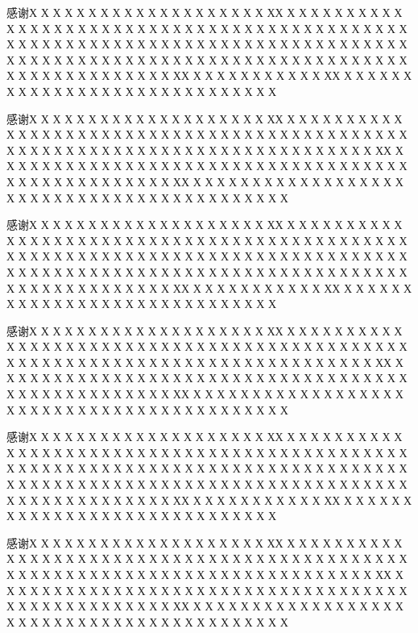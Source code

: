 \begin{thank}
	感谢Х Х Х Х Х Х Х Х Х Х Х  Х Х Х Х Х Х Х Х Х ХХ Х Х Х Х Х  Х Х Х Х Х Х Х Х Х Х Х Х Х Х Х Х Х Х Х Х Х Х Х Х Х Х Х Х Х Х Х Х Х Х Х Х Х Х Х Х Х Х Х Х Х Х Х Х  Х Х Х Х Х Х Х Х Х Х Х Х Х Х Х Х  Х Х Х Х Х Х Х Х Х Х Х Х Х Х Х Х Х Х Х Х Х Х Х Х Х Х Х Х Х Х Х Х Х Х Х Х Х Х Х Х Х Х Х Х Х Х Х Х  Х Х Х Х Х Х Х Х Х ХХ Х Х Х Х Х  Х Х Х Х Х Х ХХ Х Х Х Х Х Х Х Х Х Х Х Х Х Х Х Х Х Х Х Х Х Х Х Х Х Х Х Х Х  \par
	感谢Х Х Х Х Х Х Х Х Х Х Х  Х Х Х Х Х Х Х Х Х ХХ Х Х Х Х Х  Х Х Х Х Х Х Х Х Х Х Х Х Х Х Х Х Х Х Х Х Х Х Х Х Х Х Х Х Х Х Х Х Х Х Х Х Х Х Х Х Х Х Х Х Х Х Х Х  Х Х Х Х Х Х Х Х Х Х Х Х Х Х Х Х  Х Х Х Х Х Х ХХ Х Х Х Х Х Х Х Х Х Х Х Х Х Х Х Х Х Х Х Х Х Х Х Х Х Х Х Х Х Х Х Х Х Х Х Х Х Х Х Х  Х Х Х Х Х Х Х Х Х ХХ Х Х Х Х Х Х Х Х Х Х Х Х Х Х Х Х Х Х Х Х Х Х Х Х Х Х Х Х Х Х Х Х Х Х Х Х Х Х Х Х Х Х  \par
	感谢Х Х Х Х Х Х Х Х Х Х Х  Х Х Х Х Х Х Х Х Х ХХ Х Х Х Х Х  Х Х Х Х Х Х Х Х Х Х Х Х Х Х Х Х Х Х Х Х Х Х Х Х Х Х Х Х Х Х Х Х Х Х Х Х Х Х Х Х Х Х Х Х Х Х Х Х  Х Х Х Х Х Х Х Х Х Х Х Х Х Х Х Х  Х Х Х Х Х Х Х Х Х Х Х Х Х Х Х Х Х Х Х Х Х Х Х Х Х Х Х Х Х Х Х Х Х Х Х Х Х Х Х Х Х Х Х Х Х Х Х Х  Х Х Х Х Х Х Х Х Х ХХ Х Х Х Х Х  Х Х Х Х Х Х ХХ Х Х Х Х Х Х Х Х Х Х Х Х Х Х Х Х Х Х Х Х Х Х Х Х Х Х Х Х Х  \par
	感谢Х Х Х Х Х Х Х Х Х Х Х  Х Х Х Х Х Х Х Х Х ХХ Х Х Х Х Х  Х Х Х Х Х Х Х Х Х Х Х Х Х Х Х Х Х Х Х Х Х Х Х Х Х Х Х Х Х Х Х Х Х Х Х Х Х Х Х Х Х Х Х Х Х Х Х Х  Х Х Х Х Х Х Х Х Х Х Х Х Х Х Х Х  Х Х Х Х Х Х ХХ Х Х Х Х Х Х Х Х Х Х Х Х Х Х Х Х Х Х Х Х Х Х Х Х Х Х Х Х Х Х Х Х Х Х Х Х Х Х Х Х  Х Х Х Х Х Х Х Х Х ХХ Х Х Х Х Х Х Х Х Х Х Х Х Х Х Х Х Х Х Х Х Х Х Х Х Х Х Х Х Х Х Х Х Х Х Х Х Х Х Х Х Х Х  \par
	感谢Х Х Х Х Х Х Х Х Х Х Х  Х Х Х Х Х Х Х Х Х ХХ Х Х Х Х Х  Х Х Х Х Х Х Х Х Х Х Х Х Х Х Х Х Х Х Х Х Х Х Х Х Х Х Х Х Х Х Х Х Х Х Х Х Х Х Х Х Х Х Х Х Х Х Х Х  Х Х Х Х Х Х Х Х Х Х Х Х Х Х Х Х  Х Х Х Х Х Х Х Х Х Х Х Х Х Х Х Х Х Х Х Х Х Х Х Х Х Х Х Х Х Х Х Х Х Х Х Х Х Х Х Х Х Х Х Х Х Х Х Х  Х Х Х Х Х Х Х Х Х ХХ Х Х Х Х Х  Х Х Х Х Х Х ХХ Х Х Х Х Х Х Х Х Х Х Х Х Х Х Х Х Х Х Х Х Х Х Х Х Х Х Х Х Х  \par
	感谢Х Х Х Х Х Х Х Х Х Х Х  Х Х Х Х Х Х Х Х Х ХХ Х Х Х Х Х  Х Х Х Х Х Х Х Х Х Х Х Х Х Х Х Х Х Х Х Х Х Х Х Х Х Х Х Х Х Х Х Х Х Х Х Х Х Х Х Х Х Х Х Х Х Х Х Х  Х Х Х Х Х Х Х Х Х Х Х Х Х Х Х Х  Х Х Х Х Х Х ХХ Х Х Х Х Х Х Х Х Х Х Х Х Х Х Х Х Х Х Х Х Х Х Х Х Х Х Х Х Х Х Х Х Х Х Х Х Х Х Х Х  Х Х Х Х Х Х Х Х Х ХХ Х Х Х Х Х Х Х Х Х Х Х Х Х Х Х Х Х Х Х Х Х Х Х Х Х Х Х Х Х Х Х Х Х Х Х Х Х Х Х Х Х Х  \par
\end{thank}